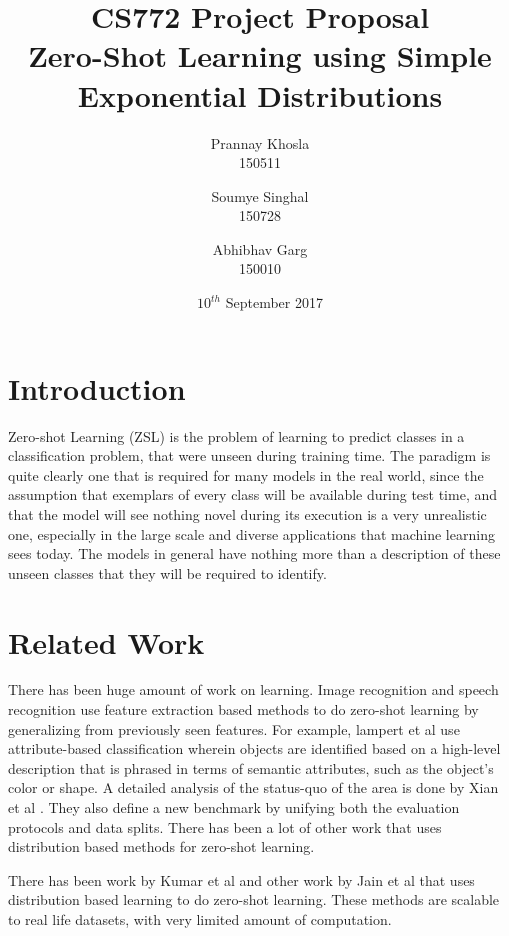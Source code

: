 \documentclass[9pt]{article}
\title{CS772 Project Proposal \\ Zero-Shot Learning using Simple Exponential Distributions}
\author{Prannay Khosla \\ 150511 \and Soumye Singhal \\ 150728 \and Abhibhav Garg \\ 150010}
\date{$10^{th}$ September 2017}
\begin{document}
\maketitle

\section*{Introduction}
Zero-shot Learning (ZSL) is the problem of learning to predict classes in a classification problem, that were unseen during training time. The paradigm is quite clearly one that is required for many models in the real world, since the assumption that exemplars of every class will be available during test time, and that the model will see nothing novel during its execution is a very unrealistic one, especially in the large scale and diverse applications that machine learning sees today. The models in general have nothing more than a description of these unseen classes that they will be required to identify.

\section*{Related Work}
There has been huge amount of work on  learning. Image recognition and speech recognition use feature extraction based methods to do zero-shot learning by generalizing from previously seen features. For example, lampert et al \cite{lampert2014attribute} use attribute-based classification wherein objects are identified based on a high-level description
that is phrased in terms of semantic attributes, such as the object’s color or shape. A detailed analysis of the status-quo of the area is done by Xian et al \cite{2017arXiv170700600X}. They also define a new benchmark by unifying both the evaluation protocols and data splits. There has been a lot of other work that uses distribution based methods for zero-shot learning.


There has been work by Kumar et al \cite{KumarVerma2017} and other work by Jain et al \cite{Jain} that uses distribution based learning to do zero-shot learning. These methods are scalable to real life datasets, with very limited amount of computation. 
\end{document}
